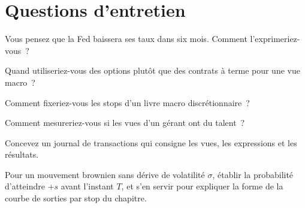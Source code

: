 \section{Questions d'entretien}

\begin{interviewq}\label{iq:s2:discretionary-macro:1}
Vous pensez que la Fed baissera ses taux dans six mois. Comment l'exprimeriez-vous~?
\end{interviewq}

\begin{interviewq}\label{iq:s2:discretionary-macro:2}
Quand utiliseriez-vous des options plutôt que des contrats à terme pour une vue macro~?
\end{interviewq}

\begin{interviewq}\label{iq:s2:discretionary-macro:3}
Comment fixeriez-vous les stops d'un livre macro discrétionnaire~?
\end{interviewq}

\begin{interviewq}\label{iq:s2:discretionary-macro:4}
Comment mesureriez-vous si les vues d'un gérant ont du talent~?
\end{interviewq}

\begin{interviewq}\label{iq:s2:discretionary-macro:5}
Concevez un journal de transactions qui consigne les vues, les expressions et les résultats.
\end{interviewq}

\begin{interviewq}\label{iq:s2:discretionary-macro:6}
Pour un mouvement brownien sans dérive de volatilité $\sigma$, établir la probabilité d'atteindre $+s$ avant l'instant $T$, et s'en servir pour expliquer la forme de la
courbe de sorties par stop du chapitre.
\end{interviewq}
